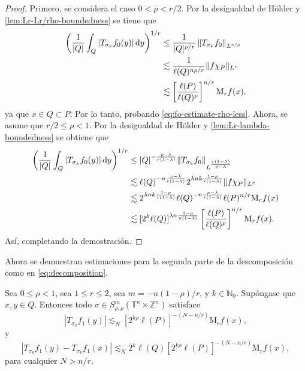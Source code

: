 \begin{proof}
	Primero, se considera el caso $0<\rho<r/2$. Por la desigualdad de H\"older y \cref{lem:Lr-Lr/rho-boundedness} se tiene que 
	\begin{align*}
		\left(
		\frac{1}{|Q|} \int_Q |T_{\sigma_k}f_0(y)|\mathop{}\!\mathrm{d} y
		\right)^{1/r} &\leq \frac{1}{|Q|^{\rho/r}} \left\| T_{\sigma_k}f_0  \right\|_{L^{r/\rho}} \\
		& \lesssim \frac{1}{\ell(Q)^{n\rho/r}} \|f \chi_P \|_{L^r} \\
		& \lesssim \left[ \frac{\ell(P)}{\ell(Q)^\rho} 
		\right]^{n/r} \mathrm{M}_rf(x),
	\end{align*}
	ya que $x \in Q \subset P$. Por lo tanto, probando \cref{eq:fo-estimate-rho-less}. Ahora, se asume que $r/2\leq \rho<1$. Por la desigualdad de H\"older y \cref{lem:Lr-lambda-boundedness} se obtiene que 
	\begin{align*}
		\left(
		\frac{1}{|Q|} \int_Q |T_{\sigma_k}f_0(y)|\mathop{}\!\mathrm{d} y
		\right)^{1/r} &\leq {|Q|^{-\frac{\rho-\lambda}{r(1-\lambda)}}} \|T_{\sigma_k}f_0\|_{L^\frac{r(1-\lambda)}{\rho-\lambda}} \\
		&\lesssim {\ell(Q)^{-n\frac{\rho-\lambda}{r(1-\lambda)}}} 2^{\lambda nk\frac{1-\rho}{r(1-\lambda)}} \|f\chi_P\|_{L^r}  \\
		& \lesssim 2^{\lambda nk\frac{1-\rho}{r(1-\lambda)}}\ell(Q)^{-n\frac{\rho-\lambda}{r(1-\lambda)}} \ell(P)^{n/r} \mathrm{M}_rf(x)\\
		&\lesssim[2^k\ell(Q)]^{\lambda n\frac{1-\rho}{n(1-\lambda)}} 
		\left[ \frac{\ell(P)}{\ell(Q)^\rho}
		\right]^{n/r} \mathrm{M}_rf(x).
	\end{align*}
	Así, completando la demostración.
\end{proof}
Ahora se demuestran estimaciones para la segunda parte de la descomposición como en \cref{eq:decomposition}.
\begin{proposition}
	Sea $0\leq \rho<1$, sea $1\leq r\leq2$, sea $m=-n(1-\rho)/r$, y $k\in\mathbb{N}_0$. Supóngase que $x, y \in Q$. Entonces todo $\sigma \in S^m_{\rho,\rho}(\mathbb{T}^n \times \mathbb{Z}^n) $ satisface
	\begin{equation}
		|T_{\sigma_k}f_1(y)| \lesssim_N [2^{k\rho}\ell(P)]^{-(N-n/r)} \mathrm{M}_rf(x),
		\label{eq:f1-estimate}
	\end{equation}
	y
	\begin{equation}
		|T_{\sigma_k}f_1(y) - T_{\sigma_k}f_1(x)| \lesssim_N 2^k\ell(Q) [2^{k\rho}\ell(P)]^{-(N-n/r)} \mathrm{M}_rf(x),
		\label{eq:diff-f1}
	\end{equation}
	para cualquier $N>n/r$.
\end{proposition}
